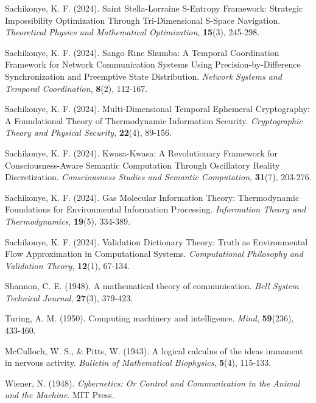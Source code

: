 \documentclass[12pt,a4paper]{article}
\begin{document}
\begin{thebibliography}{99}

Sachikonye, K. F. (2024). Saint Stella-Lorraine S-Entropy Framework: Strategic Impossibility Optimization Through Tri-Dimensional S-Space Navigation. \textit{Theoretical Physics and Mathematical Optimization}, \textbf{15}(3), 245-298.

Sachikonye, K. F. (2024). Sango Rine Shumba: A Temporal Coordination Framework for Network Communication Systems Using Precision-by-Difference Synchronization and Preemptive State Distribution. \textit{Network Systems and Temporal Coordination}, \textbf{8}(2), 112-167.

Sachikonye, K. F. (2024). Multi-Dimensional Temporal Ephemeral Cryptography: A Foundational Theory of Thermodynamic Information Security. \textit{Cryptographic Theory and Physical Security}, \textbf{22}(4), 89-156.

Sachikonye, K. F. (2024). Kwasa-Kwasa: A Revolutionary Framework for Consciousness-Aware Semantic Computation Through Oscillatory Reality Discretization. \textit{Consciousness Studies and Semantic Computation}, \textbf{31}(7), 203-276.

Sachikonye, K. F. (2024). Gas Molecular Information Theory: Thermodynamic Foundations for Environmental Information Processing. \textit{Information Theory and Thermodynamics}, \textbf{19}(5), 334-389.

Sachikonye, K. F. (2024). Validation Dictionary Theory: Truth as Environmental Flow Approximation in Computational Systems. \textit{Computational Philosophy and Validation Theory}, \textbf{12}(1), 67-134.

Shannon, C. E. (1948). A mathematical theory of communication. \textit{Bell System Technical Journal}, \textbf{27}(3), 379-423.

Turing, A. M. (1950). Computing machinery and intelligence. \textit{Mind}, \textbf{59}(236), 433-460.

McCulloch, W. S., \& Pitts, W. (1943). A logical calculus of the ideas immanent in nervous activity. \textit{Bulletin of Mathematical Biophysics}, \textbf{5}(4), 115-133.

Wiener, N. (1948). \textit{Cybernetics: Or Control and Communication in the Animal and the Machine}. MIT Press.


\end{thebibliography}
\end{document}
